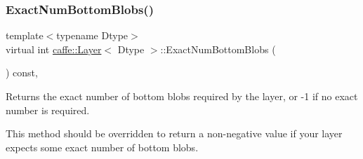 \subsubsection{\texorpdfstring{Exact\+Num\+Bottom\+Blobs()}{ExactNumBottomBlobs()}\hspace{0.1cm}{\footnotesize\ttfamily [2/2]}}
{\footnotesize\ttfamily template$<$typename Dtype$>$ \\
virtual int \mbox{\hyperlink{classcaffe_1_1_layer}{caffe\+::\+Layer}}$<$ Dtype $>$\+::Exact\+Num\+Bottom\+Blobs (\begin{DoxyParamCaption}{ }\end{DoxyParamCaption}) const\hspace{0.3cm}{\ttfamily [inline]}, {\ttfamily [virtual]}}



Returns the exact number of bottom blobs required by the layer, or -\/1 if no exact number is required. 

This method should be overridden to return a non-\/negative value if your layer expects some exact number of bottom blobs. 

